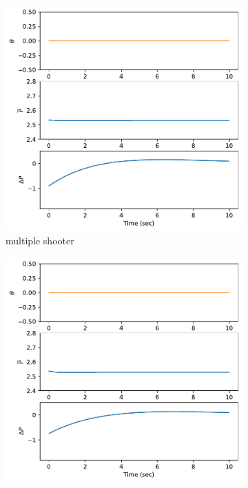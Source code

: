 \documentclass[]{article}
\begin{document}
\begin{figure}[H]
	\centering
	\begin{subfigure}[b]{0.3\textwidth}
		\centering
		\includegraphics[width=\textwidth]{figures/control45dz6.pdf}
		\caption{multiple shooter}
	\end{subfigure}
	\begin{subfigure}[b]{0.3\textwidth}
		\centering
		\includegraphics[width=\textwidth]{figures/control45dz4.pdf}

\end{subfigure}
\end{figure}
\end{document}
